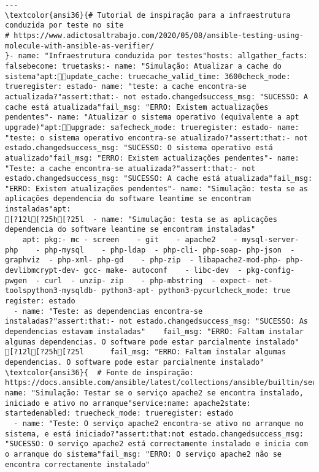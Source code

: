 \documentclass{scrartcl}
\begin{document}
\begin{Verbatim}
---
\textcolor{ansi36}{# Tutorial de inspiração para a infraestrutura conduzida por teste no site
# https://www.adictosaltrabajo.com/2020/05/08/ansible-testing-using-molecule-with-ansible-as-verifier/
}- name: "Infraestrutura conduzida por testes"hosts: allgather_facts: falsebecome: truetasks:- name: "Simulação: Atualizar a cache do sistema"apt:update_cache: truecache_valid_time: 3600check_mode: trueregister: estado- name: "teste: a cache encontra-se actualizada?"assert:that:- not estado.changedsuccess_msg: "SUCESSO: A cache está atualizada"fail_msg: "ERRO: Existem actualizações pendentes"- name: "Atualizar o sistema operativo (equivalente a apt upgrade)"apt:upgrade: safecheck_mode: trueregister: estado- name: "teste: o sistema operativo encontra-se atualizado?"assert:that:- not estado.changedsuccess_msg: "SUCESSO: O sistema operativo está atualizado"fail_msg: "ERRO: Existem actualizações pendentes"- name: "Teste: a cache encontra-se atualizada?"assert:that:- not estado.changedsuccess_msg: "SUCESSO: A cache está atualizada"fail_msg: "ERRO: Existem atualizações pendentes"- name: "Simulação: testa se as aplicações dependencia do software leantime se encontram instaladas"apt:
[?12l[?25h[?25l  - name: "Simulação: testa se as aplicações dependencia do software leantime se encontram instaladas"
    apt: pkg:- mc - screen    - git    - apache2    - mysql-server- php    - php-mysql    - php-ldap  - php-cli- php-soap- php-json  - graphviz  - php-xml- php-gd    - php-zip  - libapache2-mod-php- php-devlibmcrypt-dev- gcc- make- autoconf    - libc-dev  - pkg-config- pwgen  - curl  - unzip- zip    - php-mbstring  - expect- net-toolspython3-mysqldb- python3-apt- python3-pycurlcheck_mode: true  register: estado
  - name: "Teste: as dependencias encontra-se instaladas?"assert:that:- not estado.changedsuccess_msg: "SUCESSO: As dependencias estavam instaladas"    fail_msg: "ERRO: Faltam instalar algumas dependencias. O software pode estar parcialmente instalado"
[?12l[?25h[?25l      fail_msg: "ERRO: Faltam instalar algumas dependencias. O software pode estar parcialmente instalado"
\textcolor{ansi36}{  # Fonte de inspiração: https://docs.ansible.com/ansible/latest/collections/ansible/builtin/service_module.html}- name: "Simulação: Testar se o serviço apache2 se encontra instalado, iniciado e ativo no arranque"service:name: apache2state: startedenabled: truecheck_mode: trueregister: estado
  - name: "Teste: O serviço apache2 encontra-se ativo no arranque no sistema, e está iniciado?"assert:that:not estado.changedsuccess_msg: "SUCESSO: O serviço apache2 está correctamente instalado e inicia com o arranque do sistema"fail_msg: "ERRO: O serviço apache2 não se encontra correctamente instalado"

\end{Verbatim}
\end{document}
